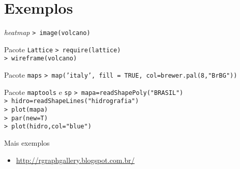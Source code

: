 \documentclass{beamer}
\begin{document}
\section{Exemplos}
\begin{frame}{\textit{heatmap}}
  \texttt{> image(volcano)}
  \begin{center}
    \end{center}

\end{frame}

\begin{frame}{Pacote \texttt{Lattice}}
   \texttt{> require(lattice)\\
> wireframe(volcano)}
  \begin{center}
    \end{center}
\end{frame}

\begin{frame}{Pacote \texttt{maps}}
\texttt{> map('italy', fill = TRUE, col=brewer.pal(8,"BrBG"))}
\begin{center}
   
\end{center}
\end{frame}

\begin{frame}{Pacote \texttt{maptools} e \texttt{sp}}
\texttt{> mapa=readShapePoly("BRASIL")\\
> hidro=readShapeLines("hidrografia")\\
> plot(mapa)\\
> par(new=T)\\
> plot(hidro,col="blue")}
\begin{center}
   
\end{center}
\end{frame}



\begin{frame}{Mais exemplos}
  \begin{itemize}
  \item \url{http://rgraphgallery.blogspot.com.br/}
  \end{itemize}

  
\end{frame}
\end{document}
